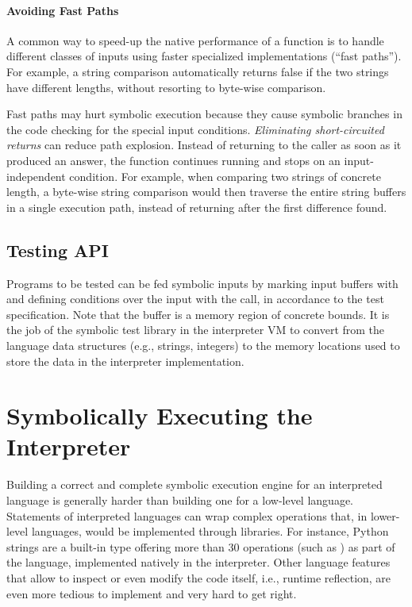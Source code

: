 \paragraph{Avoiding Fast Paths}

A common way to speed-up the native performance of a function is to handle different classes of inputs using faster specialized implementations (``fast paths'').  For example, a string comparison automatically returns false if the two strings have different lengths, without resorting to byte-wise comparison.

Fast paths may hurt symbolic execution because they cause symbolic branches in the code checking for the special input conditions.  \emph{Eliminating short-circuited returns} can reduce path explosion.  Instead of returning to the caller as soon as it produced an answer, the function continues running and stops on an input-independent condition.  For example, when comparing two strings of concrete length, a byte-wise string comparison would then traverse the entire string buffers in a single execution path, instead of returning after the first difference found.

\subsection{Testing API}
\label{sec:chef:testingAPI}

Programs to be tested can be fed symbolic inputs by marking input buffers with  and defining conditions over the input with the  call, in accordance to the test specification.  Note that the buffer is a memory region of concrete bounds.  It is the job of the symbolic test library in the interpreter VM to convert from the language data structures (e.g., strings, integers) to the memory locations used to store the data in the interpreter implementation.



\iffalse
\section{Symbolically Executing the Interpreter}

Building a correct and complete symbolic execution engine for an interpreted language is generally harder than building one for a low-level language. 
%
Statements of interpreted languages can wrap complex operations that, in lower-level languages, would be implemented through libraries. For instance, Python strings are a built-in type offering more than 30 operations (such as ) as part of the language, implemented natively in the interpreter. 
%
Other language features that allow to inspect or even modify the code itself, i.e., runtime reflection, are even more tedious to implement and very hard to get right.

